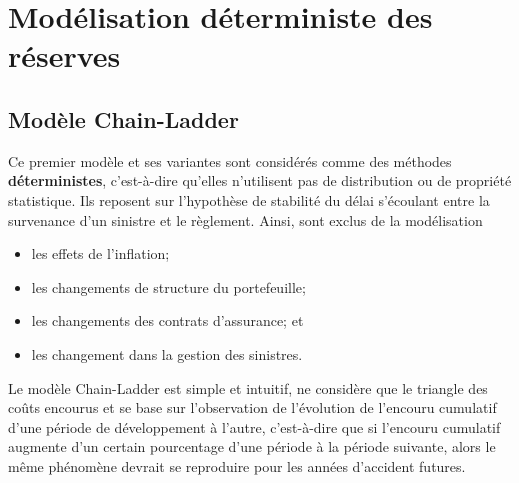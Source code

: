 
\chapter{Modélisation déterministe des réserves}
\label{chap:deterministe}

\section{Modèle Chain-Ladder}
\label{sec:deterministe:CL}

Ce premier modèle et ses variantes sont considérés comme des méthodes
\textbf{déterministes}, c'est-à-dire qu'elles n'utilisent pas de
distribution ou de propriété statistique. Ils reposent sur l'hypothèse
de stabilité du délai s'écoulant entre la survenance d'un sinistre et
le règlement. Ainsi, sont exclus de la modélisation
\begin{itemize}
\item les effets de l'inflation;
\item les changements de structure du portefeuille;
\item les changements des contrats d'assurance; et
\item les changement dans la gestion des sinistres.
\end{itemize}

Le modèle Chain-Ladder est simple et intuitif, ne considère que le
triangle des coûts encourus et se base sur l'observation de
l'évolution de l'encouru cumulatif d'une période de développement à
l'autre, c'est-à-dire que si l'encouru cumulatif augmente d'un certain
pourcentage d'une période à la période suivante, alors le même
phénomène devrait se reproduire pour les années d'accident futures.

